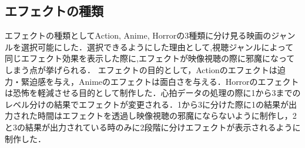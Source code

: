 \subsection{エフェクトの種類}

エフェクトの種類としてAction, Anime, Horrorの3種類に分け見る映画のジャンルを選択可能にした．選択できるようにした理由として,視聴ジャンルによって同じエフェクト効果を表示した際に,エフェクトが映像視聴の際に邪魔になってしまう点が挙げられる．
エフェクトの目的として，Actionのエフェクトは迫力・緊迫感を与え，Animeのエフェクトは面白さを与える．Horrorのエフェクトは恐怖を軽減させる目的として制作した．心拍データの処理の際に1から3までのレベル分けの結果でエフェクトが変更される．1から3に分けた際に1の結果が出力された時間はエフェクトを透過し映像視聴の邪魔にならないように制作し，2と3の結果が出力されている時のみに2段階に分けエフェクトが表示されるように制作した．
